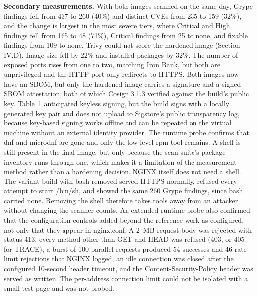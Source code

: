 \documentclass[10pt,letterpaper,twocolumn]{article}
\begin{document}
\textbf{Secondary measurements.} With both images scanned on the same day, Grype findings fell from 437 to 260 (40\%) and distinct CVEs from 235 to 159 (32\%), and the change is largest in the most severe tiers, where Critical and High findings fell from 165 to 48 (71\%), Critical findings from 25 to none, and fixable findings from 109 to none. Trivy could not score the hardened image (Section IV.D). Image size fell by 22\% and installed packages by 32\%. The number of exposed ports rises from one to two, matching Iron Bank, but both are unprivileged and the HTTP port only redirects to HTTPS. Both images now have an SBOM, but only the hardened image carries a signature and a signed SBOM attestation, both of which Cosign 3.1.3 verified against the build's public key. Table~1 anticipated keyless signing, but the build signs with a locally generated key pair and does not upload to Sigstore's public transparency log, because key-based signing works offline and can be repeated on the virtual machine without an external identity provider. The runtime probe confirms that dnf and microdnf are gone and only the low-level rpm tool remains. A shell is still present in the final image, but only because the scan suite's package inventory runs through one, which makes it a limitation of the measurement method rather than a hardening decision. NGINX itself does not need a shell. The variant build with bash removed served HTTPS normally, refused every attempt to start /bin/sh, and showed the same 260 Grype findings, since bash carried none. Removing the shell therefore takes tools away from an attacker without changing the scanner counts. An extended runtime probe also confirmed that the configuration controls added beyond the reference work as configured, not only that they appear in nginx.conf. A 2~MB request body was rejected with status 413, every method other than GET and HEAD was refused (403, or 405 for TRACE), a burst of 100 parallel requests produced 54 successes and 46 rate-limit rejections that NGINX logged, an idle connection was closed after the configured 10-second header timeout, and the Content-Security-Policy header was served as written. The per-address connection limit could not be isolated with a small test page and was not probed.
\end{document}
